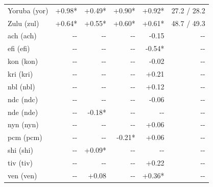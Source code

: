 {\begin{longtable}[]{@{}lrrrrr@{}}
Yoruba (yor) & +0.98* & +0.49* & +0.90* & +0.92* & 27.2 / 28.2 \\
Zulu (zul) & +0.64* & +0.55* & +0.60* & +0.61* & 48.7 / 49.3 \\
ach (ach) & -\/- & -\/- & -\/- & -0.15 & -\/- \\
efi (efi) & -\/- & -\/- & -\/- & -0.54* & -\/- \\
kon (kon) & -\/- & -\/- & -\/- & -0.02 & -\/- \\
kri (kri) & -\/- & -\/- & -\/- & +0.21 & -\/- \\
nbl (nbl) & -\/- & -\/- & -\/- & +0.12 & -\/- \\
ndc (ndc) & -\/- & -\/- & -\/- & -0.06 & -\/- \\
nde (nde) & -\/- & -0.18* & -\/- & -\/- & -\/- \\
nyn (nyn) & -\/- & -\/- & -\/- & +0.06 & -\/- \\
pcm (pcm) & -\/- & -\/- & -0.21* & +0.06 & -\/- \\
shi (shi) & -\/- & +0.09* & -\/- & -\/- & -\/- \\
tiv (tiv) & -\/- & -\/- & -\/- & +0.22 & -\/- \\
ven (ven) & -\/- & +0.08 & -\/- & +0.36* & -\/- \\
\end{longtable}
}

